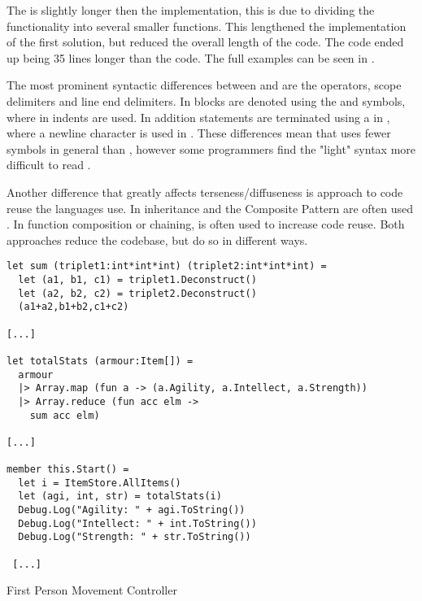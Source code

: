 The \fs is slightly longer then the \cs implementation, this is due to dividing the functionality into several smaller functions. This lengthened the implementation of the first solution, but reduced the overall length of the code. The \cs code ended up being 35 lines longer than the \fs code. The full examples can be seen in .

The most prominent syntactic differences between \cs and \fs are the operators, scope delimiters and line end delimiters. In \cs blocks are denoted using the \m{\{} and \m{\}} symbols, where in \fs indents are used. In addition statements are terminated using a \m{;} in \cs, where a newline character is used in \fs. These differences mean that \fs uses fewer symbols in general than \cs, however some programmers find the "light" syntax more difficult to read \needcite.

Another difference that greatly affects terseness/diffuseness is approach to code reuse the languages use. In \cs inheritance and the Composite Pattern \needcite are often used \needcite. In \fs function composition or chaining, is often used to increase code reuse. Both approaches reduce the codebase, but do so in different ways.

\begin{listing}[H]
\begin{verbatim}
let sum (triplet1:int*int*int) (triplet2:int*int*int) =
  let (a1, b1, c1) = triplet1.Deconstruct()
  let (a2, b2, c2) = triplet2.Deconstruct()
  (a1+a2,b1+b2,c1+c2)

[...]

let totalStats (armour:Item[]) =
  armour
  |> Array.map (fun a -> (a.Agility, a.Intellect, a.Strength))
  |> Array.reduce (fun acc elm ->
    sum acc elm)

[...]

member this.Start() =
  let i = ItemStore.AllItems()
  let (agi, int, str) = totalStats(i)
  Debug.Log("Agility: " + agi.ToString())
  Debug.Log("Intellect: " + int.ToString())
  Debug.Log("Strength: " + str.ToString())

 [...]
\end{verbatim}
\caption{First Person Movement Controller \fs}
\label{lst:fs-armour}
\end{listing}
